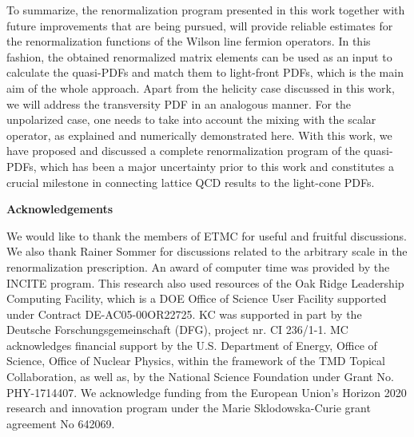 \documentclass[12pt,tighten,nofootinbib,amssymb,floatfix]{article}
\begin{document}
\medskip
To summarize, the renormalization program presented in this work together with future improvements that are being pursued,
will provide reliable estimates for the renormalization functions of the Wilson line fermion operators. In this fashion, the obtained 
renormalized matrix elements can be used as an input to 
calculate the quasi-PDFs and match them to light-front PDFs, which is the main aim of the whole approach.
Apart from the helicity case discussed in this work, we will address the transversity PDF in an analogous manner. For the unpolarized case, one needs
to take into account the mixing with the scalar operator, as explained and numerically demonstrated here. 
With this work, we have proposed and discussed a complete renormalization program of the quasi-PDFs, which has been a major 
uncertainty prior to this work and constitutes a crucial milestone in connecting lattice QCD results to the light-cone PDFs.

\vspace*{1cm}
\centerline{\bf\large{Acknowledgements}}
\medskip
We would like to thank the members of ETMC for useful and fruitful discussions. 
We also thank Rainer Sommer for discussions related to the arbitrary scale in the renormalization prescription. 
An award of computer time was provided by the INCITE program. This research also used resources of the Oak Ridge Leadership Computing Facility, which is a DOE Office of Science User Facility supported under Contract DE-AC05-00OR22725.
KC was supported in part by the Deutsche Forschungsgemeinschaft (DFG), project nr. CI 236/1-1.
MC acknowledges financial support by the U.S. Department of Energy, Office of Science, Office of Nuclear Physics, 
within the framework of the TMD Topical Collaboration, as well as, by the National Science Foundation under Grant No. PHY-1714407.
We acknowledge funding from the European Union's Horizon 2020 research and innovation program
under the Marie Sklodowska-Curie grant agreement No 642069. 
 
\vspace*{1cm}

%

\end{document}
